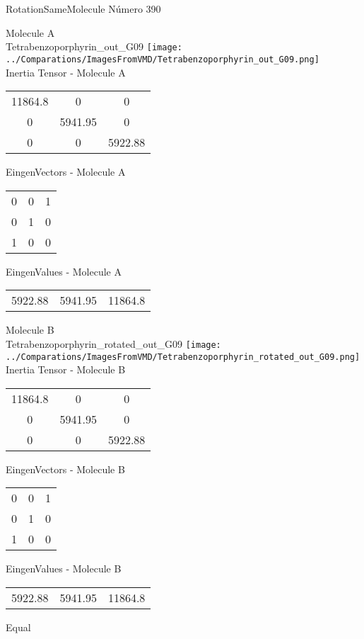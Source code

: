 \vtab[-2cm]
\begin{center}
{\large RotationSameMolecule \tab Número 390}
\end{center}
\begin{multicols}{2}
\begin{center}

Molecule A \\ 
Tetrabenzoporphyrin\_out\_G09
\texttt{[image: ../Comparations/ImagesFromVMD/Tetrabenzoporphyrin\_out\_G09.png]}
\\
Inertia Tensor - Molecule A \\
\vtab

\begin{tabular}{|c c c|}
11864.8	 & 	0	 & 	0	 \\
0	 & 	5941.95	 & 	0	 \\
0	 & 	0	 & 	5922.88
\end{tabular}

\vtab
 EingenVectors - Molecule A     \\
\vtab
\begin{tabular}{|c c c|}
0	 & 	0	 & 	1	 \\
0	 & 	1	 & 	0	 \\
1	 & 	0	 & 	0
\end{tabular}

\vtab
 EingenValues - Molecule A     \\
\vtab
\begin{tabular}{|c c c|}
5922.88	 & 	5941.95	 & 	11864.8	 \\
\end{tabular}
\columnbreak

Molecule B \\ 
Tetrabenzoporphyrin\_rotated\_out\_G09
\texttt{[image: ../Comparations/ImagesFromVMD/Tetrabenzoporphyrin\_rotated\_out\_G09.png]}
\\
Inertia Tensor - Molecule B \\
\vtab

\begin{tabular}{|c c c|}
11864.8	 & 	0	 & 	0	 \\
0	 & 	5941.95	 & 	0	 \\
0	 & 	0	 & 	5922.88
\end{tabular}

\vtab
 EingenVectors - Molecule B     \\
\vtab
\begin{tabular}{|c c c|}
0	 & 	0	 & 	1	 \\
0	 & 	1	 & 	0	 \\
1	 & 	0	 & 	0
\end{tabular}

\vtab
 EingenValues - Molecule B     \\
\vtab
\begin{tabular}{|c c c|}
5922.88	 & 	5941.95	 & 	11864.8	 \\
\end{tabular}

\end{center}
\end{multicols}
\begin{center}
\vtab
\vtab
\textcolor{NavyBlue}{\Large Equal}
\end{center}

